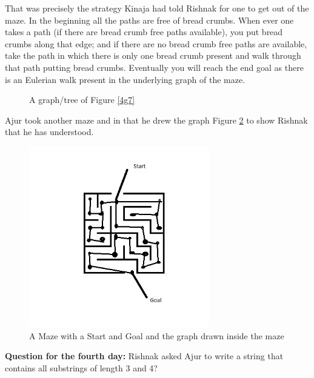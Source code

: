 That was precisely the strategy Kinaja had told Rishnak for one to get out of the maze.  In the beginning all the paths are free of bread crumbs. When ever one takes a path (if there are bread crumb free paths available), you put bread crumbs along that edge; and if there are no bread crumb free paths are available, take the path in which there is only one bread crumb present and walk through that path putting bread crumbs. Eventually you will reach the end goal as there is an Eulerian walk present in the underlying graph of the maze. %

\begin{figure}
\begin{center}
\caption{ A graph/tree of Figure \ref{4g7}}\label{4g8}
\end{center}
\end{figure}

Ajur took another maze and in that he drew the graph Figure \ref{4g9} to show Rishnak that he has understood.

\begin{figure}
\begin{center}
\includegraphics[width=0.7\textwidth]{anothermaze.jpg}
\caption{A Maze with a Start and Goal and the graph drawn inside the maze}\label{4g9}
\end{center}
\end{figure}
\vspace{3in}
\textbf{Question for the fourth day:}
Rishnak asked Ajur to write a string that contains all substrings of length 3 and 4?

